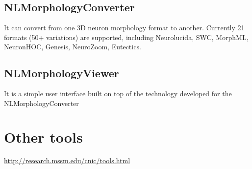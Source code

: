 \subsection{NLMorphologyConverter}
\label{sec:NLMorphologyConverter}

It can convert from one 3D neuron morphology format to another.
Currently 21 formats (50+ variations) are supported, including Neurolucida, SWC,
MorphML, NeuronHOC, Genesis, NeuroZoom, Eutectics. 


\subsection{NLMorphologyViewer}

It is a simple user interface built on top of the technology developed for the
NLMorphologyConverter


\section{Other tools}


\url{http://research.mssm.edu/cnic/tools.html}

